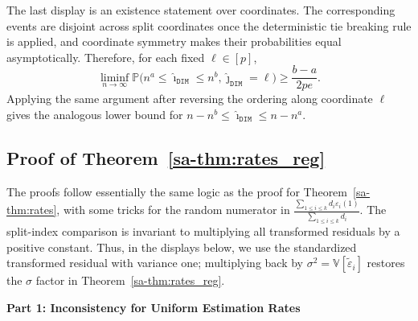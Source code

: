 \documentclass[10pt]{article}
\def\V{\mathbb{V}}
\def\DIM{\mathtt{DIM}}
\theoremstyle{definition}
\theoremstyle{remark}
\begin{document}
The last display is an existence statement over coordinates. The corresponding events are disjoint across split coordinates once the deterministic tie breaking rule is applied, and coordinate symmetry makes their probabilities equal asymptotically. Therefore, for each fixed $\ell\in[p]$,
\[
    \liminf_{n \rightarrow \infty} \mathbb{P}\Big( n^{a} \leq \hat{\imath}_{\DIM} \leq n^{b}, \hat{\jmath}_{\DIM}=\ell \Big) \geq \frac{b-a}{2pe}.
\]
Applying the same argument after reversing the ordering along coordinate $\ell$ gives the analogous lower bound for $n-n^b \leq \hat{\imath}_{\DIM} \leq n-n^a$.



\subsection{Proof of Theorem~\ref{sa-thm:rates_reg}}

The proofs follow essentially the same logic as the proof for Theorem~\ref{sa-thm:rates}, with some tricks for the random numerator in $\frac{\sum_{1 \leq i \leq k} d_i \varepsilon_i(1)}{\sum_{1 \leq i \leq k} d_i}$. The split-index comparison is invariant to multiplying all transformed residuals by a positive constant. Thus, in the displays below, we use the standardized transformed residual with variance one; multiplying back by $\sigma^2=\V[\tilde\varepsilon_i]$ restores the $\sigma$ factor in Theorem~\ref{sa-thm:rates_reg}.

\begin{center}
    \textbf{Part 1: Inconsistency for Uniform Estimation Rates}
\end{center}
\end{document}
